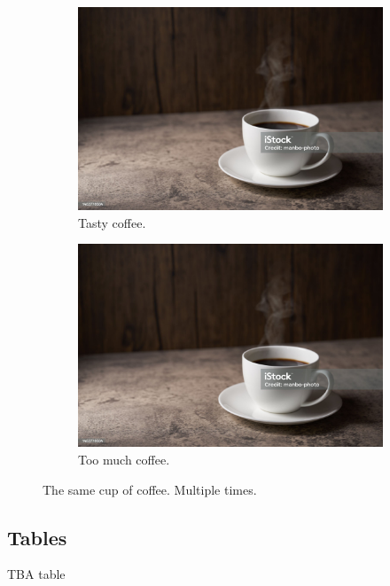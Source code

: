 \documentclass{article}
\begin{document}
\begin{figure}[h!]
\begin{subfigure}[b]{0.2\linewidth}
    \includegraphics[width=\linewidth]{coffee.jpg}
    \caption{Tasty coffee.}
  \end{subfigure}
  \begin{subfigure}[b]{0.5\linewidth}
    \includegraphics[width=\linewidth]{coffee.jpg}
    \caption{Too much coffee.}
  \end{subfigure}
  \caption{The same cup of coffee. Multiple times.}
  \label{fig:coffee3}
\end{figure}

\subsection{Tables}
\begin{table}
  \caption{TBA table}
\end{table}

\begin{appendix}
  \listoffigures
  \listoftables
\end{appendix}
\end{document}
